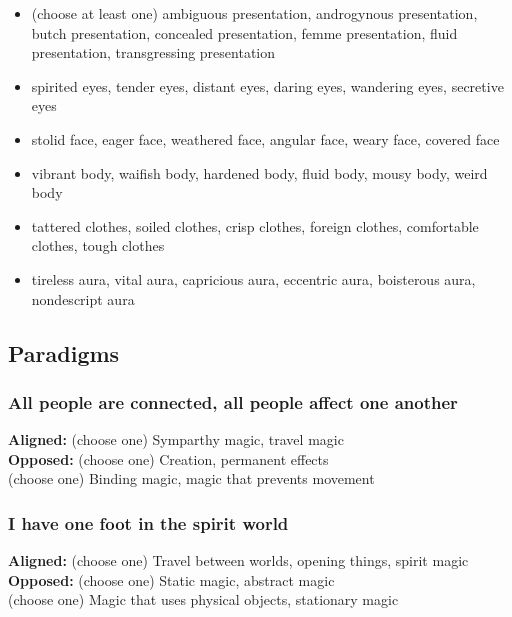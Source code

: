 \documentclass[
  oneside,
  statementpaper,
  9pt]{memoir}
\begin{document}
\begin{itemize}
\tightlist
\item
  (choose at least one) ambiguous presentation, androgynous
  presentation, butch presentation, concealed presentation, femme
  presentation, fluid presentation, transgressing presentation
\item
  spirited eyes, tender eyes, distant eyes, daring eyes, wandering eyes,
  secretive eyes
\item
  stolid face, eager face, weathered face, angular face, weary face,
  covered face
\item
  vibrant body, waifish body, hardened body, fluid body, mousy body,
  weird body
\item
  tattered clothes, soiled clothes, crisp clothes, foreign clothes,
  comfortable clothes, tough clothes
\item
  tireless aura, vital aura, capricious aura, eccentric aura, boisterous
  aura, nondescript aura
\end{itemize}

\hypertarget{paradigms-8}{%
\subsection{Paradigms}\label{paradigms-8}}

\hypertarget{all-people-are-connected-all-people-affect-one-another}{%
\subsubsection{All people are connected, all people affect one
another}\label{all-people-are-connected-all-people-affect-one-another}}

\textbf{Aligned:} (choose one) Symparthy magic, travel magic\\
\textbf{Opposed:} (choose one) Creation, permanent effects\\
(choose one) Binding magic, magic that prevents movement

\hypertarget{i-have-one-foot-in-the-spirit-world}{%
\subsubsection{I have one foot in the spirit
world}\label{i-have-one-foot-in-the-spirit-world}}

\textbf{Aligned:} (choose one) Travel between worlds, opening things,
spirit magic\\
\textbf{Opposed:} (choose one) Static magic, abstract magic\\
(choose one) Magic that uses physical objects, stationary magic
\end{document}
